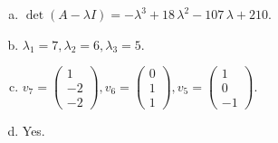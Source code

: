 \begin{questions}
\begin{solution}
\begin{enumerate}[(a)]
\item $\det(A-\lambda I)=-{\lambda}^{3} + 18 \, {\lambda}^{2} - 107 \, {\lambda} + 210$.
\item ${\lambda}_1=7, {\lambda}_2=6, {\lambda}_3=5$.
\item $v_{7}=\left(\begin{array}{r}
1 \\
-2 \\
-2
\end{array}\right), v_{6}=\left(\begin{array}{r}
0 \\
1 \\
1
\end{array}\right), v_{5}=\left(\begin{array}{r}
1 \\
0 \\
-1
\end{array}\right)$.
\item Yes.
\end{enumerate}
\end{solution}

\end{questions}

\newpage


\begin{center}
\end{center}

